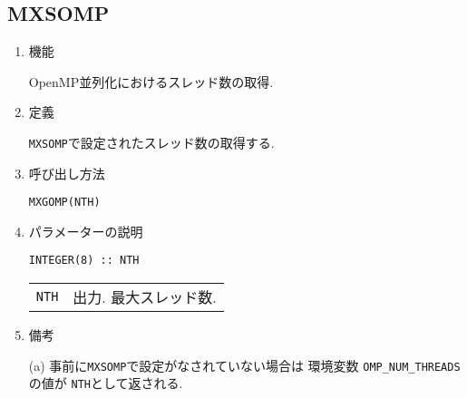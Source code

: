 \documentclass[a4j]{jsarticle}
\begin{document}

\subsection{MXSOMP}

\begin{enumerate}

\item 機能 

OpenMP並列化におけるスレッド数の取得.

\item 定義

\texttt{MXSOMP}で設定されたスレッド数の取得する.
  
\item 呼び出し方法 

\texttt{MXGOMP(NTH)}

\item パラメーターの説明

\begin{verbatim}
INTEGER(8) :: NTH
\end{verbatim}

\begin{tabular}{ll}
\texttt{NTH} & 出力. 最大スレッド数.
\end{tabular}

\item 備考

(a) 事前に\texttt{MXSOMP}で設定がなされていない場合は
  環境変数 \texttt{OMP\_NUM\_THREADS}の値が \texttt{NTH}として返される.

\end{enumerate}
\end{document}
